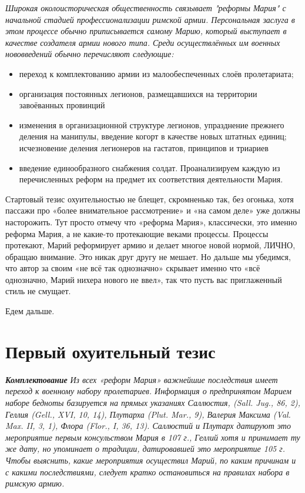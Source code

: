 \textit{Широкая околоисторическая общественность связывает "реформы Мария" с начальной стадией профессионализации римской армии. Персональная заслуга в этом процессе обычно приписывается самому Марию, который выступает в качестве создателя армии нового типа. Среди осуществлённых им военных нововведений обычно перечисляют следующие:}
	\begin{itemize}
		\item переход к комплектованию армии из малообеспеченных слоёв пролетариата;
		\item  организация постоянных легионов, размещавшихся на территории завоёванных провинций
		\item  изменения в организационной структуре легионов, упразднение прежнего деления на манипулы, введение когорт в качестве новых штатных единиц; исчезновение деления легионеров на гастатов, принципов и триариев
		\item введение единообразного снабжения солдат. Проанализируем каждую из перечисленных реформ на предмет их соответствия деятельности Мария.
	\end{itemize}




Стартовый тезис охуительностью не блещет, скромненько так, без огонька, хотя пассажи про «более внимательное рассмотрение» и «на самом деле» уже должны насторожить. Тут просто отмечу что «реформа Мария», классически, это именно реформа Мария, а не какие-то протекающие веками процессы. Процессы протекают, Марий реформирует армию и делает многое новой нормой, ЛИЧНО, обращаю внимание. Это никак друг другу не мешает. Но дальше мы убедимся, что автор за своим «не всё так однозначно» скрывает именно что «всё однозначно, Марий нихера нового не ввел», так что пусть вас приглаженный стиль не смущает.

Едем дальше. 

\section{Первый охуительный тезис}
\textbf{\textit{Комплектование}}
\textit{Из всех «реформ Мария» важнейшие последствия имеет переход к военному набору пролетариев. Информация о предпринятом Марием наборе бедноты базируется на прямых указаниях Саллюстия, (Sall. Jug., 86, 2), Геллия (Gell., XVI, 10, 14), Плутарха (Plut. Mar., 9), Валерия Максима (Val. Max. II, 3, 1), Флора (Flor., I, 36, 13). Саллюстий и Плутарх датируют это мероприятие первым консульством Мария в 107 г., Геллий хотя и принимает ту же дату, но упоминает о традиции, датировавшей это мероприятие 105 г. Чтобы выяснить, какие мероприятия осуществил Марий, по каким причинам и с какими последствиями, следует кратко остановиться на правилах набора в римскую армию.}


